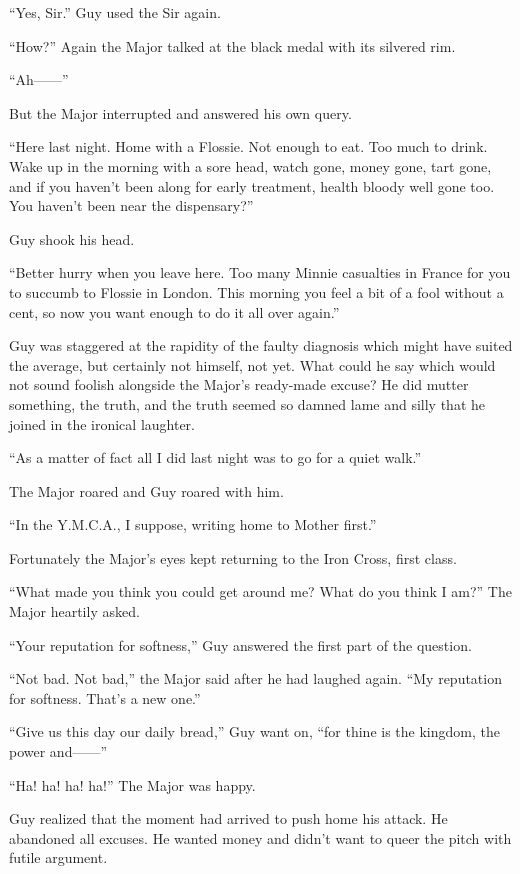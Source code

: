``Yes, Sir.'' Guy used the Sir again.

``How?'' Again the Major talked at the black medal with its silvered rim.

``Ah------''

But the Major interrupted and answered his own query.

``Here last night. Home with a Flossie. Not enough to eat. Too much to drink. Wake up in the morning with a sore head, watch gone, money gone, tart gone, and if you haven't been along for early treatment, health bloody well gone too. You haven't been near the dispensary?''

Guy shook his head.

``Better hurry when you leave here. Too many Minnie casualties in France for you to succumb to Flossie in London. This morning you feel a bit of a fool without a cent, so now you want enough to do it all over again.''

Guy was staggered at the rapidity of the faulty diagnosis which might have suited the average, but certainly not himself, not yet. What could he say which would not sound foolish alongside the Major's ready-made excuse? He did mutter something, the truth, and the truth seemed so damned lame and silly that he joined in the ironical laughter.

``As a matter of fact all I did last night was to go for a quiet walk.''

The Major roared and Guy roared with him.

``In the Y.M.C.A., I suppose, writing home to Mother first.''

Fortunately the Major's eyes kept returning to the Iron Cross, first class.

``What made you think you could get around me? What do you think I am?'' The Major heartily asked.

``Your reputation for softness,'' Guy answered the first part of the question.

``Not bad. Not bad,'' the Major said after he had laughed again. ``My reputation for softness. That's a new one.''

``Give us this day our daily bread,'' Guy want on, ``for thine is the kingdom, the power and------''

``Ha! ha! ha! ha!'' The Major was happy.

Guy realized that the moment had arrived to push home his attack. He abandoned all excuses. He wanted money and didn't want to queer the pitch with futile argument.

